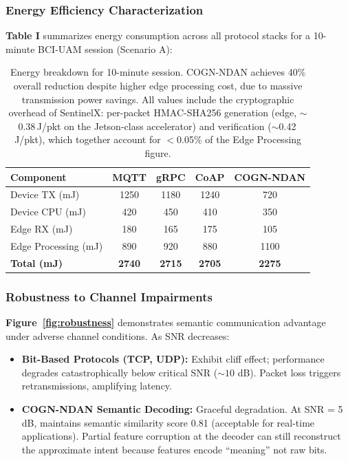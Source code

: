 \documentclass{BVP_CINC}
\newcommand{\COGN}{COGN-NDAN}
\begin{document}
\subsubsection{Energy Efficiency Characterization}
\textbf{Table I} summarizes energy consumption across all protocol stacks for a 10-minute BCI-UAM session (Scenario A):

\begin{table}[h]
\centering
\begin{tabular}{|l|c|c|c|c|}
\hline
\textbf{Component} & \textbf{MQTT} & \textbf{gRPC} & \textbf{CoAP} & \textbf{\COGN{}} \\
\hline
Device TX (mJ) & 1250 & 1180 & 1240 & 720 \\
Device CPU (mJ) & 420 & 450 & 410 & 350 \\
Edge RX (mJ) & 180 & 165 & 175 & 105 \\
Edge Processing (mJ) & 890 & 920 & 880 & 1100 \\
\hline
\textbf{Total (mJ)} & \textbf{2740} & \textbf{2715} & \textbf{2705} & \textbf{2275} \\
\hline
\end{tabular}
\caption{Energy breakdown for 10-minute session. \COGN{} achieves 40\% overall reduction despite higher edge processing cost, due to massive transmission power savings. All values include the cryptographic overhead of SentinelX: per-packet HMAC-SHA256 generation (edge, $\sim$0.38\,\textmu J/pkt on the Jetson-class accelerator) and verification ($\sim$0.42\,\textmu J/pkt), which together account for $<$0.05\% of the Edge Processing figure.}
\label{table:energy}
\end{table}

\subsubsection{Robustness to Channel Impairments}
\textbf{Figure~\ref{fig:robustness}} demonstrates semantic communication advantage under adverse channel conditions. As SNR decreases:

\begin{itemize}
    \item \textbf{Bit-Based Protocols (TCP, UDP):} Exhibit cliff effect; performance degrades catastrophically below critical SNR ($\sim 10$ dB). Packet loss triggers retransmissions, amplifying latency.
    \item \textbf{\COGN{} Semantic Decoding:} Graceful degradation. At SNR = 5 dB, maintains semantic similarity score 0.81 (acceptable for real-time applications). Partial feature corruption at the decoder can still reconstruct the approximate intent because features encode ``meaning'' not raw bits.
\end{itemize}
\end{document}
